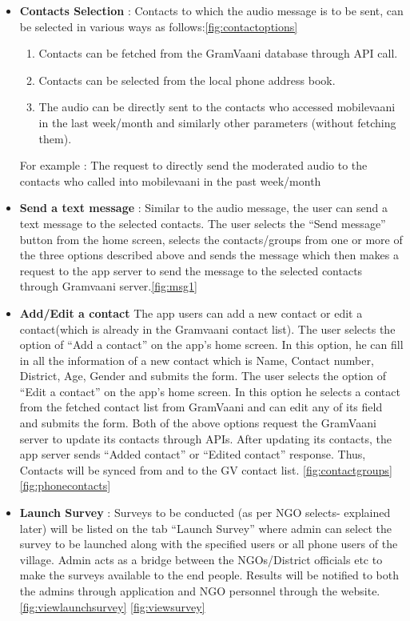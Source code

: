 \begin{itemize}
\begin {enumerate}
\end {enumerate}


\item \textbf{Contacts Selection }: Contacts to which the audio message is to be sent, can be selected in various ways as follows:\ref{fig:contactoptions}
	\begin{enumerate}
	\item	Contacts can be fetched from the GramVaani database through API call.
	\item Contacts can be selected from the local phone address book.
	\item The audio can be directly sent to the contacts who accessed mobilevaani in the last week/month and similarly other parameters (without fetching them).
	\end{enumerate}
	
For example : The request to directly send the moderated audio to the contacts who called into mobilevaani in the past week/month


	
\item \textbf{Send a text message }: Similar to the audio message, the user can send a text message to the selected contacts. The user selects the “Send message” button from the home screen, selects the
contacts/groups from one or more of the three options described above and sends the
message which then makes a request to the app server to send the message to the
selected contacts through Gramvaani server.\ref{fig:msg1}

\item \textbf{Add/Edit a contact}
The app users can add a new contact or edit a contact(which is already in the Gramvaani
contact list). The user selects the option of “Add a contact” on the app’s home screen. In this option, he can fill in all the information of a new contact which is Name, Contact number, District, Age, Gender and submits the form.
The user selects the option of “Edit a contact” on the app’s home screen. In this option he selects a contact from the fetched contact list from GramVaani and can edit any of its field and submits the form.
Both of the above options request the GramVaani server to update its contacts through
APIs. After updating its contacts, the app server sends “Added contact” or “Edited
contact” response. Thus, Contacts will be synced from and to the GV contact list. \ref{fig:contactgroups} \ref{fig:phonecontacts}

\item \textbf{Launch Survey} :
Surveys to be conducted (as per NGO selects- explained later) will be listed on the tab
“Launch Survey” where admin can select the survey to be launched along with the specified
users or all phone users of the village. Admin acts as a bridge between the NGOs/District
officials etc to make the surveys available to the end people. Results will be notified to
both the admins through application and NGO personnel through the website. \ref{fig:viewlaunchsurvey} \ref{fig:viewsurvey}
	
\end{itemize}





